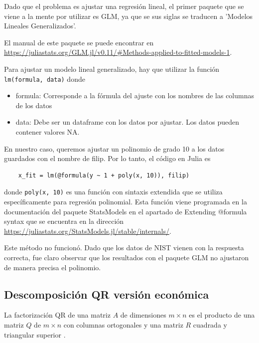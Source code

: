 Dado que el problema es ajustar una regresión lineal, el primer paquete que se viene a la mente por utilizar es \textsf{GLM}, ya que se sus siglas se traducen a 'Modelos Lineales Generalizados'.


El manual de este paquete se puede encontrar en \url{https://juliastats.org/GLM.jl/v0.11/#Methods-applied-to-fitted-models-1}.  

Para ajustar un modelo lineal generalizado, hay que utilizar la función \texttt{lm(formula, data)} donde 

\begin{itemize}
    \item formula: 
    Corresponde a la fórmula del ajuste con los nombres de las columnas de los datos
    \item data:
    Debe ser un dataframe con los datos por ajustar. Los datos pueden contener valores NA. 
\end{itemize}

En nuestro caso, queremos ajustar un polinomio de grado 10 a los datos guardados con el nombre de filip. Por lo tanto, el código en Julia es

\begin{verbatim}
    x_fit = lm(@formula(y ~ 1 + poly(x, 10)), filip)
\end{verbatim}

donde \texttt{poly(x, 10)} es una función con sintaxis extendida que se utiliza específicamente para regresión polinomial. Esta función viene programada en la documentación del paquete \textsf{StatsModels} en el apartado de \textsf{Extending @formula syntax} que se encuentra en la dirección \url{https://juliastats.org/StatsModels.jl/stable/internals/}. 



Este método no funcionó. Dado que los datos de NIST vienen con la respuesta correcta, fue claro observar que los resultados con el paquete GLM no ajustaron de manera precisa el polinomio. 

\subsection{Descomposición QR versión económica}

\begin{definition}
La factorización QR de una matriz $A$ de dimensiones $m \times n$ es el producto de una matriz $Q$ de $m \times n$ con columnas ortogonales y una matriz $R$ cuadrada y triangular superior \cite[p.~191]{garcia2017second}. 
\end{definition}

